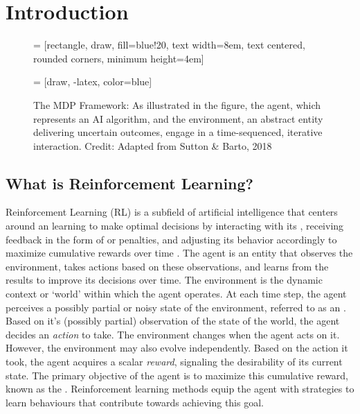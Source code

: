 \section{Introduction}
\begin{figure}
    \centering
     = [rectangle, draw, fill=blue!20,
    text width=8em, text centered, rounded corners, minimum height=4em]

     = [draw, -latex, color=blue]

    \caption{The MDP Framework: As illustrated in the figure, the agent, which represents an AI algorithm, and the environment, an abstract entity delivering uncertain outcomes, engage in a time-sequenced, iterative interaction. Credit: Adapted from Sutton \& Barto, 2018 \cite{RL} }
    \label{fig:my_label}
\end{figure}

\subsection{What is Reinforcement Learning?}
Reinforcement Learning (RL) is a subfield of artificial intelligence that centers around an  learning to make optimal decisions by interacting with its , receiving feedback in the form of  or penalties, and adjusting its behavior accordingly to maximize cumulative rewards over time \cite{RL}. The agent is  an entity that observes the environment, takes actions based on these observations, and learns from the results to improve its decisions over time. The environment is the dynamic context or `world' within which the agent operates. At each time step, the agent perceives a possibly partial or noisy state of the environment, referred to as an . Based on it's (possibly partial) observation of the state of the world, the agent decides an \textit{action} to take. The environment changes when the agent acts on it. However, the environment may also evolve independently.  Based on the action it took, the agent acquires a scalar \textit{reward}, signaling the desirability of its current state.  The primary objective of the agent is to maximize this cumulative reward, known as the . Reinforcement learning methods equip the agent with strategies to learn behaviours that contribute towards achieving this goal.

